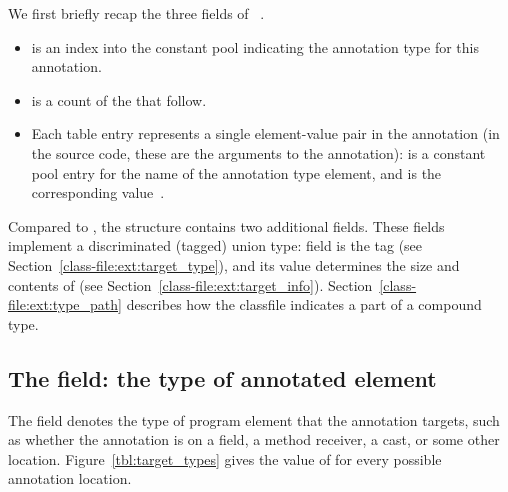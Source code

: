 \documentclass[10pt]{article}
\begin{document}


We first briefly recap
the three fields of ~\cite[\S 4.8.15]{LindholmYBB2012}.

\begin{itemize}
\item {} is an index into the constant pool indicating the
  annotation type for this annotation.
\item {} is a count of the
   that follow.
\item Each  table entry represents a single
  element-value pair in the annotation (in the source code, these are the
  arguments to the annotation):   is a
  constant pool entry for the name of the annotation type element, and
   is the corresponding value~\cite[\S 4.8.15.1]{LindholmYBB2012}.
\end{itemize}

Compared to ,
the \extendedannotation structure contains two additional fields.
These fields implement a discriminated (tagged) union type:
field  is the tag (see
Section~\ref{class-file:ext:target_type}), and its value determines the
size and
contents of  (see Section~\ref{class-file:ext:target_info}).
Section~\ref{class-file:ext:type_path} describes how the classfile
indicates a part of a compound type.


\subsection{The  field:  the type of annotated element\label{class-file:ext:target_type}\label{target_type}}

The  field denotes the type of program element that
the annotation targets, such as whether the annotation is on a field, a
method receiver, a cast, or some other location.
Figure~\ref{tbl:target_types} gives the value of  for
every possible annotation location.
\end{document}
